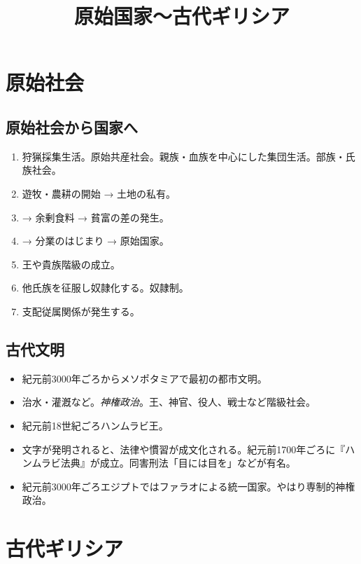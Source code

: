 \documentclass[uplatex,dvipdfmx]{jsarticle} \usepackage{mystyle}%
\title{原始国家〜古代ギリシア}
\begin{document}
\maketitle
\else

\chapter{原始社会}


\fi






\section{原始社会から国家へ}

\begin{enumerate}

\item 狩猟採集生活。原始共産社会。親族・血族を中心にした集団生活。部族・氏族社会。
\item 遊牧・農耕の開始 → 土地の私有。
\item → 余剰食料 → 貧富の差の発生。
\item → 分業のはじまり → 原始国家。
\item 王や貴族階級の成立。
\item 他氏族を征服し奴隷化する。奴隷制。
\item 支配従属関係が発生する。
\end{enumerate}


\section{古代文明}

\begin{itemize}
\item 紀元前3000年ごろからメソポタミアで最初の都市文明。
\item 治水・灌漑など。\emph{神権政治}。王、神官、役人、戦士など階級社会。
\item 紀元前18世紀ごろハンムラビ王。
\item 文字が発明されると、法律や慣習が成文化される。紀元前1700年ごろに『ハンムラビ法典』が成立。同害刑法「目には目を」などが有名。
\item 紀元前3000年ごろエジプトではファラオによる統一国家。やはり専制的神権政治。
\end{itemize}


\ifx\mybook\undefined
\else
\chapter{古代ギリシア}\fi
\end{document}

